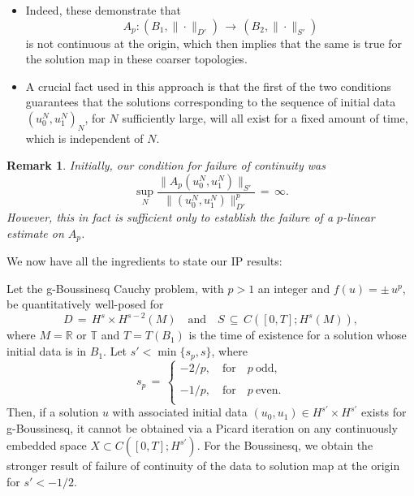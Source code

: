 \documentclass{beamer}
\numberwithin{equation}{section}
\newtheorem{remark}{Remark}
\begin{document}
\begin{frame}
  \begin{itemize}
    \item Indeed, these demonstrate that 
\begin{equation*}
A_{p}: (B_1,\|\cdot \|_{D'})\,\longrightarrow\,(B_2,\| \cdot\|_{S'})
\end{equation*} 
is not continuous at the origin, which then implies that the same is true for the solution map in these coarser  topologies.
\pause
\item A crucial fact used in this approach is that the first of the two conditions guarantees that the solutions corresponding to the sequence of initial data $\left(u^N_0,u^N_1\right)_N$, for $N$ sufficiently large, will all exist for a fixed amount of time, which is independent of $N$. 
\end{itemize}
\end{frame}
\begin{frame}
\begin{remark}
Initially, our condition for failure of continuity was
\begin{equation*}
  \sup_N \frac{\|A_p\left(u^N_0,u^N_1\right)\|_{S'}}{\|\left(u^N_0,u^N_1\right)\|_{D'}^{p}}\,=\,\infty.
\end{equation*}
However, this in fact is sufficient only to establish the failure of a $p$-linear estimate on $A_{p}$. 
\end{remark}
\pause
We now have all the ingredients to state our IP results:
\end{frame}
\begin{frame}
\begin{theorem}
Let the g-Boussinesq Cauchy problem, with $p>1$ an integer and $f(u)=\pm\, u^p$, be quantitatively well-posed for
\[
D\,=\,H^s \times H^{s-2}(M) \quad \text{and} \quad S\,\subseteq \,C([0,T]; H^s(M)), \]
where  $M=\mathbb{R}$ or $\mathbb{T}$ and $T=T(B_1)$ is the time of existence for a solution whose initial data is in $B_1$. Let $s'< \min\{s_p, s\}$,
where
\begin{equation*}
s_p\,=\,\left\{
\begin{array}{l}
-2/p, \quad \text{for} \quad p \ \text{odd},\\
\\
-1/p, \quad \text{for} \quad p \ \text{even}.\\
\end{array}\right.
\label{sp}
\end{equation*}
Then, if a solution $u$ with associated initial data $(u_{0}, u_{1}) \in H^{s'} \times H^{s'}$ exists for g-Boussinesq, it cannot be obtained via a Picard iteration on any continuously embedded space $X \subset C([0, T]; H^{s'})$. For the Boussinesq, we obtain the stronger result of failure of continuity of the data to solution map at the origin for $s' < -1/2$.
\end{theorem}
\end{frame}
\end{document}
